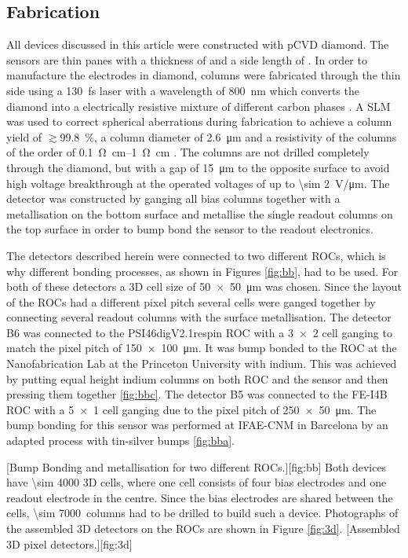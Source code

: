 \subsection{Fabrication}
All devices discussed in this article were constructed with \ac{pCVD} diamond. The sensors are thin panes with a thickness of  and a side length of . In order to manufacture the electrodes in diamond, columns were fabricated through the thin side using a \SI{130}{\femto\second} laser with a wavelength of \SI{800}{\nano\meter} which converts the diamond into a electrically resistive mixture of different carbon phases \cite{3dfab}. A \ac{SLM} was used to correct spherical aberrations during fabrication to achieve a column yield of $\gtrsim$\SI{ 99.8}{\%}, a column diameter of \SI{2.6}{\micro\meter} and a resistivity of the columns of the order of \SIrange{.1}{1}{\ohm\cm} \cite{slm}. The columns are not drilled completely through the diamond, but with a gap of \SI{15}{\micro\meter} to the opposite surface to avoid high voltage breakthrough at the operated voltages of up to \SI{\sim 2}{\volt/\um}. The detector was constructed by ganging all bias columns together with a metallisation on the bottom surface and metallise the single readout columns on the top surface in order to bump bond the sensor to the readout electronics.\par
The detectors described herein were connected to two different \acp{ROC}, which is why different bonding processes, as shown in Figures \ref{fig:bb}, had to be used. For both of these detectors a 3D cell size of \SI{50x50}{\micro\meter} was chosen. Since the layout of the \acp{ROC} had a different pixel pitch several cells were ganged together by connecting several readout columns with the surface metallisation. The detector B6 was connected to the PSI46digV2.1respin \ac{ROC} \cite{kornmayer} with a \SI{3x2}{} cell ganging to match the pixel pitch of \SI{150x100}{\micro\meter}. It was bump bonded to the \ac{ROC} at the Nanofabrication Lab at the Princeton University with indium. This was achieved by putting equal height indium columns on both \ac{ROC} and the sensor and then pressing them together \ref{fig:bbc}. The detector B5 was connected to the FE-I4B \ac{ROC} \cite{fei4} with a \SI{5x1}{} cell ganging due to the pixel pitch of \SI{250x50}{\micro\meter}. The bump bonding for this sensor was performed at IFAE-CNM in Barcelona by an adapted process with tin-silver bumps \ref{fig:bba}.\par
{}[Bump Bonding and metallisation for two different \acp{ROC}.][fig:bb]
Both devices have \SI{\sim 4000}{} 3D cells, where one cell consists of four bias electrodes and one readout electrode in the centre. Since the bias electrodes are shared between the cells, \SI{\sim 7000}{columns} had to be drilled to build such a device.
Photographs of the assembled 3D detectors on the \acp{ROC} are shown in Figure \vref{fig:3d}. 
[Assembled 3D pixel detectors.][fig:3d]